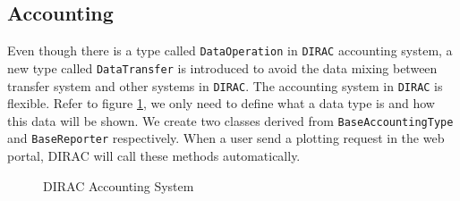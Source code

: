\subsection{Accounting}

Even though there is a type called {\tt DataOperation} in {\tt DIRAC}
accounting system, a new type called {\tt DataTransfer}
is introduced to avoid the data mixing between transfer system
and other systems in {\tt DIRAC}.
The accounting system 
in {\tt DIRAC} is flexible. Refer to figure \ref{fig:acct},
we only need to define 
what a data type is and how this data will be shown.
We create two classes derived from {\tt BaseAccountingType}
and {\tt BaseReporter} respectively.
When a user send a plotting request in the web portal, 
DIRAC will call these methods automatically.
\begin{figure}[htbp]
    
    \caption{\label{fig:acct}DIRAC Accounting System}
\end{figure}
